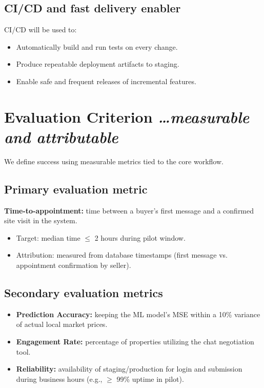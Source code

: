 \documentclass[11pt,a4paper]{article}
\newcommand{\BvrHint}[1]{%
  {\normalfont\normalsize\itshape\hfill #1}}
\begin{document}
\subsection{CI/CD and fast delivery enabler}
CI/CD will be used to:
\begin{itemize}[leftmargin=0.7cm]
    \item Automatically build and run tests on every change.
    \item Produce repeatable deployment artifacts to staging.
    \item Enable safe and frequent releases of incremental features.
\end{itemize}

\section{Evaluation Criterion %
\BvrHint{\ldots measurable and attributable}}
We define success using measurable metrics tied to the core workflow.

\subsection{Primary evaluation metric}
\textbf{Time-to-appointment:} time between a buyer's first message and a confirmed site visit in the system.
\begin{itemize}[leftmargin=0.7cm]
    \item Target: median time $\le$ 2 hours during pilot window.
    \item Attribution: measured from database timestamps (first message vs. appointment confirmation by seller).
\end{itemize}

\subsection{Secondary evaluation metrics}
\begin{itemize}[leftmargin=0.7cm]
    \item \textbf{Prediction Accuracy:} keeping the ML model's MSE within a 10\% variance of actual local market prices.
    \item \textbf{Engagement Rate:} percentage of properties utilizing the chat negotiation tool.
    \item \textbf{Reliability:} availability of staging/production for login and submission during business hours (e.g., $\ge$ 99\% uptime in pilot).
\end{itemize}
\end{document}
